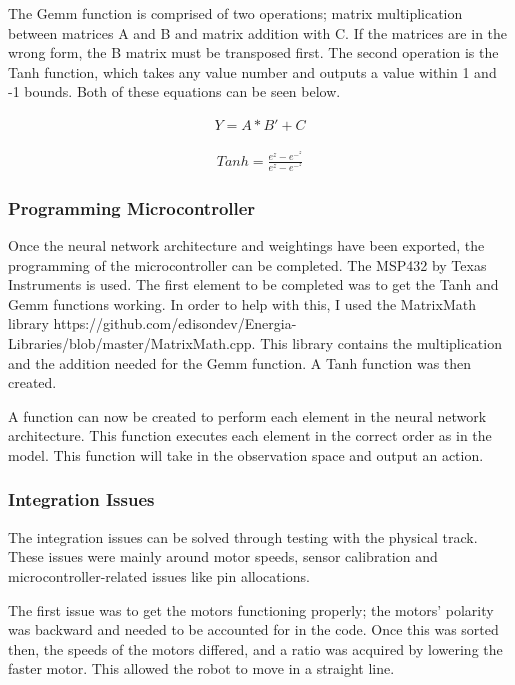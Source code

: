 \documentclass[12pt]{article}
\begin{document}
The Gemm function is comprised of two operations; matrix multiplication between matrices A and B and matrix addition with C. If the matrices are in the wrong form, the B matrix must be transposed first. The second operation is the Tanh function, which takes any value number and outputs a value within 1 and -1 bounds. Both of these equations can be seen below. 

\begin{equation}
\begin{aligned}
Y = A*B' + C
\end{aligned}
\end{equation}


\begin{equation}
\begin{aligned}
Tanh = \frac{e^z-e^-^z}{e^z-e^-^z}
\end{aligned}
\end{equation}



\subsubsection{Programming Microcontroller}
Once the neural network architecture and weightings have been exported, the programming of the microcontroller can be completed. The MSP432 by Texas Instruments is used. The first element to be completed was to get the Tanh and Gemm functions working. In order to help with this, I used the MatrixMath library https://github.com/edisondev/Energia-Libraries/blob/master/MatrixMath.cpp. This library contains the multiplication and the addition needed for the Gemm function. A Tanh function was then created. 

A function can now be created to perform each element in the neural network architecture. This function executes each element in the correct order as in the model. This function will take in the observation space and output an action. 


\subsubsection{Integration Issues}

The integration issues can be solved through testing with the physical track. These issues were mainly around motor speeds, sensor calibration and microcontroller-related issues like pin allocations. 

The first issue was to get the motors functioning properly; the motors' polarity was backward and needed to be accounted for in the code. Once this was sorted then, the speeds of the motors differed, and a ratio was acquired by lowering the faster motor. This allowed the robot to move in a straight line. 
\end{document}
